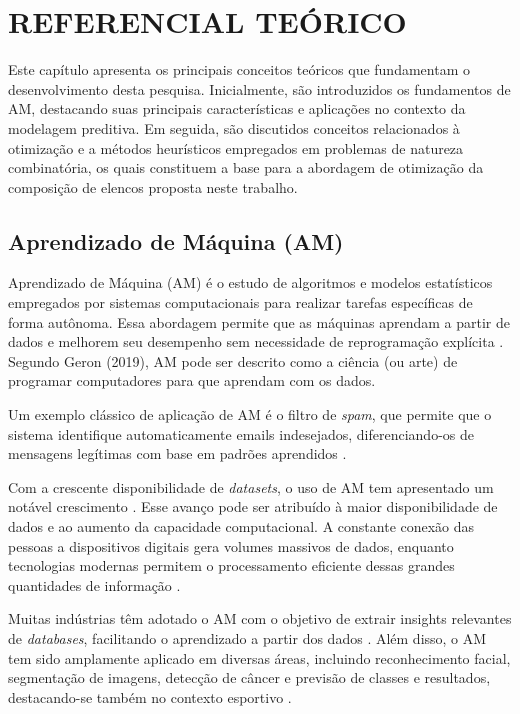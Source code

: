 \chapter{REFERENCIAL TEÓRICO}

Este capítulo apresenta os principais conceitos teóricos que fundamentam o desenvolvimento desta pesquisa. 
Inicialmente, são introduzidos os fundamentos de AM, destacando suas principais características e aplicações no contexto da modelagem preditiva. 
Em seguida, são discutidos conceitos relacionados à otimização e a métodos heurísticos empregados em problemas de natureza combinatória, os quais constituem 
a base para a abordagem de otimização da composição de elencos proposta neste trabalho.

\section{Aprendizado de Máquina (AM)}

Aprendizado de Máquina (AM) é o estudo de algoritmos e modelos estatísticos empregados por sistemas computacionais para realizar tarefas específicas de forma autônoma. 
Essa abordagem permite que as máquinas aprendam a partir de dados e melhorem seu desempenho sem necessidade de reprogramação explícita \cite{Mahesh2020}. 
Segundo Geron (2019), AM pode ser descrito como a ciência (ou arte) de programar computadores para que aprendam com os dados.

Um exemplo clássico de aplicação de AM é o filtro de \textit{spam}, que permite que o sistema identifique automaticamente emails indesejados, 
diferenciando-os de mensagens legítimas com base em padrões aprendidos \cite{Geron2019}. 

Com a crescente disponibilidade de \textit{datasets}, o uso de AM tem apresentado um notável crescimento \cite{Mahesh2020}. 
Esse avanço pode ser atribuído à maior disponibilidade de dados e ao aumento da capacidade computacional. 
A constante conexão das pessoas a dispositivos digitais gera volumes massivos de dados, enquanto tecnologias modernas permitem o 
processamento eficiente dessas grandes quantidades de informação \cite{Jordan2015}.

Muitas indústrias têm adotado o AM com o objetivo de extrair insights relevantes de \textit{databases}, facilitando o aprendizado a partir dos dados \cite{Mahesh2020}. 
Além disso, o AM tem sido amplamente aplicado em diversas áreas, incluindo reconhecimento facial, segmentação de imagens, detecção de câncer e previsão de classes 
e resultados, destacando-se também no contexto esportivo \cite{Almulla2023}.

